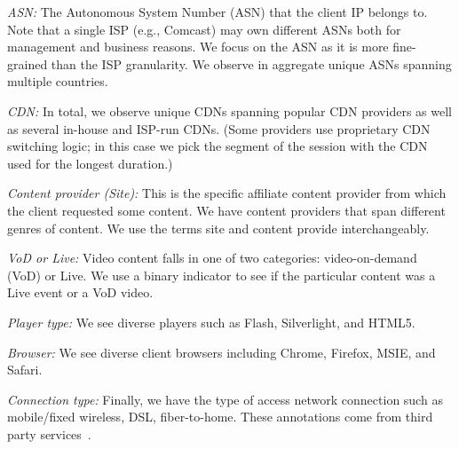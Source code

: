 \begin{packedenumerate}
\item \emph{ASN:} The Autonomous System Number (ASN) that the client IP belongs
 to. Note that a single ISP (e.g., Comcast) may own different ASNs both
 for management and business reasons. We focus on the ASN as it is more fine-grained
 than the ISP granularity.  We observe in aggregate \fillme unique ASNs
  spanning multiple countries.

\item \emph{CDN:}   In total, we observe
\fillme unique CDNs spanning popular CDN providers as well as several in-house and
ISP-run CDNs. (Some providers use proprietary CDN switching logic; in
this case we pick the segment of the session with the CDN used for the longest
duration.)

\item \emph{Content provider (Site):} This is the specific affiliate content
provider from which the client requested some content. We have  \fillme content
providers that span different genres of content.  We use the terms site and
content provide interchangeably.

\item \emph{VoD or Live:} Video  content  falls in one
 of two categories: video-on-demand (VoD) or Live.  We use a binary indicator to
 see if the particular content was a Live event or a VoD video.

\item \emph{Player type:} We see diverse  players such as  Flash, Silverlight,
and HTML5.

\item \emph{Browser:} We see diverse client browsers including Chrome, Firefox,
MSIE, and Safari.

\item \emph{Connection type:} Finally, we  have the type of
access network connection such  as
 mobile/fixed wireless, DSL, fiber-to-home. These annotations come from third party services~\cite{quova}.

\end{packedenumerate}

